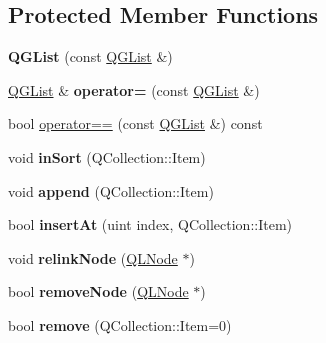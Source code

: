 \subsection*{Protected Member Functions}
\begin{DoxyCompactItemize}
\item 
\mbox{\label{class_q_g_list_a5215004b76329c79a02ae01134acc946}} 
{\bfseries Q\+G\+List} (const \mbox{\hyperlink{class_q_g_list}{Q\+G\+List}} \&)
\item 
\mbox{\label{class_q_g_list_a4703bb593e7ccd0936cef358ded96080}} 
\mbox{\hyperlink{class_q_g_list}{Q\+G\+List}} \& {\bfseries operator=} (const \mbox{\hyperlink{class_q_g_list}{Q\+G\+List}} \&)
\item 
bool \mbox{\hyperlink{class_q_g_list_a66d00b29e3ce5513eed4b28652039a4c}{operator==}} (const \mbox{\hyperlink{class_q_g_list}{Q\+G\+List}} \&) const
\item 
\mbox{\label{class_q_g_list_a1613bab545e4e7d3e5c68de22e024128}} 
void {\bfseries in\+Sort} (Q\+Collection\+::\+Item)
\item 
\mbox{\label{class_q_g_list_a3fc7fb06dc2347dc27fdeea23e8abffc}} 
void {\bfseries append} (Q\+Collection\+::\+Item)
\item 
\mbox{\label{class_q_g_list_a2404fe31bb1b1e57fb530e3ad5059b0e}} 
bool {\bfseries insert\+At} (uint index, Q\+Collection\+::\+Item)
\item 
\mbox{\label{class_q_g_list_a8962d8770498694d0805a5003f160776}} 
void {\bfseries relink\+Node} (\mbox{\hyperlink{class_q_l_node}{Q\+L\+Node}} $\ast$)
\item 
\mbox{\label{class_q_g_list_af146dd013966d2571f182dc9f1eca10b}} 
bool {\bfseries remove\+Node} (\mbox{\hyperlink{class_q_l_node}{Q\+L\+Node}} $\ast$)
\item 
\mbox{\label{class_q_g_list_a2110da1b8f8b1a3ab1d9063deb31055e}} 
bool {\bfseries remove} (Q\+Collection\+::\+Item=0)
\item 
\mbox{\label{class_q_g_list_aa14205a4214d12b86c133255c094affd}} 

\end{DoxyCompactItemize}
